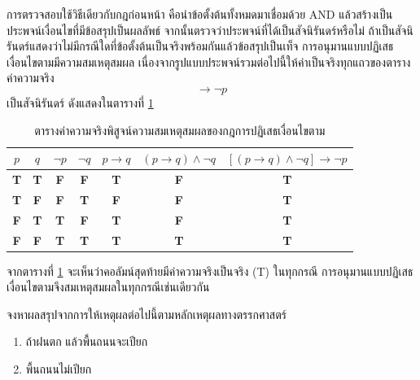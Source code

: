 การตรวจสอบใช้วิธีเดียวกับกฎก่อนหน้า คือนำข้อตั้งต้นทั้งหมดมาเชื่อมด้วย AND แล้วสร้างเป็นประพจน์เงื่อนไขที่มีข้อสรุปเป็นผลลัพธ์ จากนั้นตรวจว่าประพจน์ที่ได้เป็นสัจนิรันดร์หรือไม่ ถ้าเป็นสัจนิรันดร์แสดงว่าไม่มีกรณีใดที่ข้อตั้งต้นเป็นจริงพร้อมกันแล้วข้อสรุปเป็นเท็จ การอนุมานแบบปฏิเสธเงื่อนไขตามมีความสมเหตุสมผล เนื่องจากรูปแบบประพจน์รวมต่อไปนี้ให้ค่าเป็นจริงทุกแถวของตารางค่าความจริง~\parencite{velleman2019prove}
\begin{equation}
[(p \rightarrow q) \land \neg q] \rightarrow \neg p
\end{equation}
เป็นสัจนิรันดร์ ดังแสดงในตารางที่ \ref{tab:modus-tollens-valid}

\begin{table}[H]
    \centering
    \caption{ตารางค่าความจริงพิสูจน์ความสมเหตุสมผลของกฎการปฏิเสธเงื่อนไขตาม}
    \label{tab:modus-tollens-valid}
    \begin{tabular}{|c|c|c|c|c|c|c|}
        \hline
        $p$ & $q$ & $\neg p$ & $\neg q$ & $p \rightarrow q$ & $(p \rightarrow q) \land \neg q$ & $[(p \rightarrow q) \land \neg q] \rightarrow \neg p$ \\ \hline
        \textbf{T} & \textbf{T} & \textbf{F} & \textbf{F} & \textbf{T} & \textbf{F} & \textbf{T} \\ \hline
        \textbf{T} & \textbf{F} & \textbf{F} & \textbf{T} & \textbf{F} & \textbf{F} & \textbf{T} \\ \hline
        \textbf{F} & \textbf{T} & \textbf{T} & \textbf{F} & \textbf{T} & \textbf{F} & \textbf{T} \\ \hline
        \textbf{F} & \textbf{F} & \textbf{T} & \textbf{T} & \textbf{T} & \textbf{T} & \textbf{T} \\ \hline
    \end{tabular}
\end{table}

จากตารางที่ \ref{tab:modus-tollens-valid} จะเห็นว่าคอลัมน์สุดท้ายมีค่าความจริงเป็นจริง (T) ในทุกกรณี การอนุมานแบบปฏิเสธเงื่อนไขตามจึงสมเหตุสมผลในทุกกรณีเช่นเดียวกัน

\begin{ex}
\label{ex:modus-tollens-rain}
จงหาผลสรุปจากการให้เหตุผลต่อไปนี้ตามหลักเหตุผลทางตรรกศาสตร์
\begin{enumerate}
    \item ถ้าฝนตก แล้วพื้นถนนจะเปียก
    \item พื้นถนนไม่เปียก
\end{enumerate}
\end{ex}

